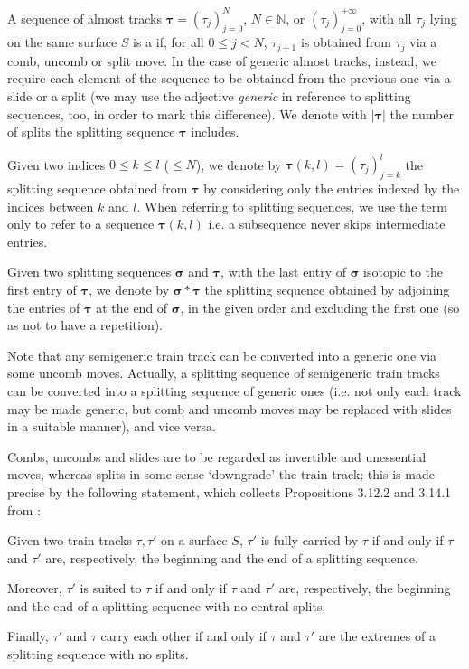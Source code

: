 \begin{defin}
A sequence of almost tracks $\bm\tau=(\tau_j)_{j=0}^N$, $N\in\mathbb N$, or $(\tau_j)_{j=0}^{+\infty}$, with all $\tau_j$ lying on the same surface $S$ is a  if, for all $0\leq j <N$, $\tau_{j+1}$ is obtained from $\tau_j$ via a comb, uncomb or split move. In the case of generic almost tracks, instead, we require each element of the sequence to be obtained from the previous one via a slide or a split (we may use the adjective \emph{generic} in reference to splitting sequences, too, in order to mark this difference). We denote with $|\bm\tau|$ the number of splits the splitting sequence $\bm\tau$ includes.

Given two indices $0\leq k\leq l$ ($\leq N$), we denote by $\bm\tau(k,l)=(\tau_j)_{j=k}^l$ the splitting sequence obtained from $\bm\tau$ by considering only the entries indexed by the indices between $k$ and $l$. When referring to splitting sequences, we use the term  only to refer to a sequence $\bm\tau(k,l)$ i.e. a subsequence never skips intermediate entries.

Given two splitting sequences $\bm\sigma$ and $\bm\tau$, with the last entry of $\bm\sigma$ isotopic to the first entry of $\bm\tau$, we denote by $\bm\sigma*\bm\tau$ the splitting sequence obtained by adjoining the entries of $\bm\tau$ at the end of $\bm\sigma$, in the given order and excluding the first one (so as not to have a repetition).
\end{defin}

Note that any semigeneric train track can be converted into a generic one via some uncomb moves. Actually, a splitting sequence of semigeneric train tracks can be converted into a splitting sequence of generic ones (i.e. not only each track may be made generic, but comb and uncomb moves may be replaced with slides in a suitable manner), and vice versa.

Combs, uncombs and slides are to be regarded as invertible and unessential moves, whereas splits in some sense `downgrade' the train track; this is made precise by the following statement, which collects Propositions 3.12.2 and 3.14.1 from \cite{mosher}:
\begin{prop}\label{prp:carriediffsplit}
Given two train tracks $\tau,\tau'$ on a surface $S$, $\tau'$ is fully carried by $\tau$ if and only if $\tau$ and $\tau'$ are, respectively, the beginning and the end of a splitting sequence.

Moreover, $\tau'$ is suited to $\tau$ if and only if $\tau$ and $\tau'$ are, respectively, the beginning and the end of a splitting sequence with no central splits.

Finally, $\tau'$ and $\tau$ carry each other if and only if $\tau$ and $\tau'$ are the extremes of a splitting sequence with no splits.
\end{prop}

